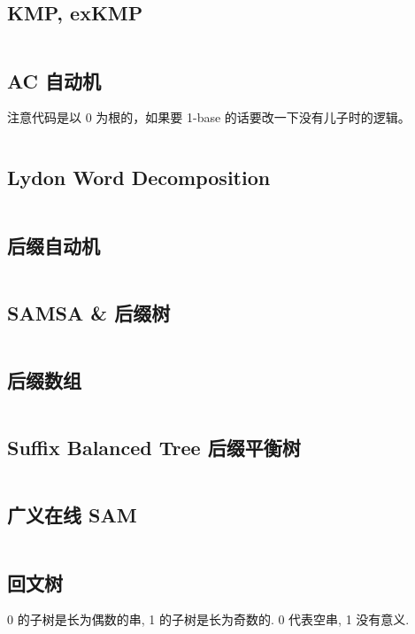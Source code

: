 \documentclass[titlepage, a4paper]{article}
\begin{document}
\begin{multicols}{2}
\begin{spacing}{0.6}
				\subsection{KMP, exKMP}
					\inputminted{cpp}{src/String/KMP.cpp}
				\subsection{AC 自动机}
					注意代码是以 0 为根的，如果要 1-base 的话要改一下没有儿子时的逻辑。
					\inputminted{cpp}{src/String/AC 自动机.cpp}
				\subsection{Lydon Word Decomposition}
					\inputminted{cpp}{src/String/Lyndon Word.cpp}
				\subsection{后缀自动机}
					\inputminted{cpp}{src/String/SAM.cpp}
				\subsection{SAMSA \& 后缀树}
					\inputminted{cpp}{src/String/SAMSA.cpp}
				\subsection{后缀数组}
					\inputminted{cpp}{src/String/SA.cpp}
				\subsection{Suffix Balanced Tree 后缀平衡树}
					\inputminted{cpp}{src/String/后缀平衡树.cpp}
				\subsection{广义在线 SAM}
				\inputminted{cpp}{src/String/generalizedSAM.cpp}
				\subsection{回文树}
					0 的子树是长为偶数的串, 1 的子树是长为奇数的. 0 代表空串, 1 没有意义.
					\inputminted{cpp}{src/String/PAM.cpp}

\end{spacing}
\end{multicols}
\end{document}
